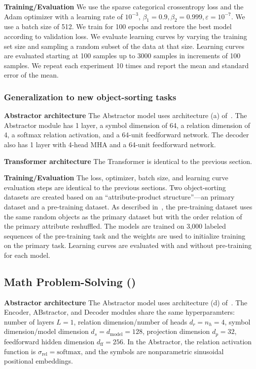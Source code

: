 \textbf{Training/Evaluation} We use the sparse categorical crossentropy loss and the Adam optimizer with a learning rate of $10^{-3}$, $\beta_1 = 0.9, \beta_2 = 0.999, \varepsilon = 10^{-7}$. We use a batch size of 512. We train for 100 epochs and restore the best model according to validation loss. We evaluate learning curves by varying the training set size and sampling a random subset of the data at that size. Learning curves are evaluated starting at 100 samples up to 3000 samples in increments of 100 samples. We repeat each experiment 10 times and report the mean and standard error of the mean.

\subsubsection{Generalization to new object-sorting tasks}

\textbf{Abstractor architecture} The Abstractor model uses architecture (a) of~. The Abstractor module has 1 layer, a symbol dimension of 64, a relation dimension of 4, a softmax relation activation, and a 64-unit feedforward network. The decoder also has 1 layer with 4-head MHA and a 64-unit feedforward network.

\textbf{Transformer architecture} The Transformer is identical to the previous section.

\textbf{Training/Evaluation} The loss, optimizer, batch size, and learning curve evaluation steps are identical to the previous sections. Two object-sorting datasets are created based on an ``attribute-product structure''---an primary dataset and a pre-training dataset. As described in~, the pre-training dataset uses the same random objects as the primary dataset but with the order relation of the primary attribute reshuffled. The models are trained on 3,000 labeled sequences of the pre-training task and the weights are used to initialize training on the primary task. Learning curves are evaluated with and without pre-training for each model.

\subsection{Math Problem-Solving ()}

\textbf{Abstractor architecture} The Abstractor model uses architecture (d) of~. The Encoder, ABstractor, and Decoder modules share the same hyperparamters: number of layers $L = 1$, relation dimension/number of heads $d_r = n_h = 4$, symbol dimension/model dimension $d_s = d_{\mathrm{model}} = 128$, projection dimension $d_p = 32$, feedforward hidden dimension $d_{\mathrm{ff}} = 256$. In the Abstractor, the relation activation function is $\sigma_{\mathrm{rel}} = \mathrm{softmax}$, and the symbols are nonparametric sinusoidal positional embeddings.


